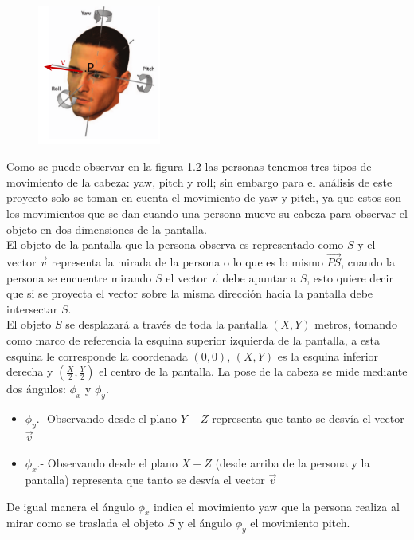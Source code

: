     \begin{figure}[htbp]
    	\centering
    	\includegraphics[width=0.36\textwidth]{./pictures/personaMirando}
    	\caption{}\label{fig: figura}
    \end{figure}
    
    Como se puede observar en la figura 1.2 las personas tenemos tres tipos de movimiento de la cabeza: yaw, pitch y roll; sin embargo para el análisis de este proyecto solo se toman en cuenta el movimiento de yaw y pitch, ya que estos son los movimientos que se dan cuando una persona mueve su cabeza para observar el objeto en dos dimensiones de la pantalla.\\
    El objeto de la pantalla que la persona observa es representado como $S$ y el vector $\vec v$ representa la mirada de la persona o lo que es lo mismo $\vec{PS}$, cuando la persona se encuentre mirando $S$ el vector $\vec v$  debe apuntar a $S$, esto quiere decir que si se proyecta el vector sobre la misma dirección hacia la pantalla debe intersectar $S$.\\
    El objeto $S$ se desplazará a través de toda la pantalla $(X,Y)$ metros, tomando como marco de referencia la esquina superior izquierda de la pantalla, a esta esquina le corresponde la coordenada $(0,0)$, $(X,Y)$ es la esquina inferior derecha y $(\frac{X}{2}, \frac{Y}{2})$ el centro de la pantalla.
    La pose de la cabeza se mide mediante dos ángulos: $\phi_x$ y $\phi_y$.
    \begin{itemize}
    	\item $\phi_y$.- Observando desde el plano $Y-Z$ representa que tanto se desvía el vector $\vec v$%
    	\item $\phi_x$.- Observando desde el plano $X-Z$ (desde arriba de la persona y la pantalla) representa que tanto se desvía el vector $\vec v$ %
    \end{itemize}
    De igual manera el ángulo $\phi_x$ indica el movimiento yaw que la persona realiza al mirar como se traslada el objeto $S$ y el ángulo $\phi_y$ el movimiento pitch.
    
